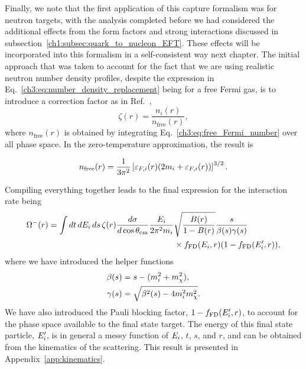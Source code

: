 Finally, we note that the first application of this capture formalism was for neutron targets, with the analysis completed before we had considered the additional effects from the form factors and strong interactions discussed in subsection~\ref{ch1:subsec:quark_to_nucleon_EFT}. These effects will be incorporated into this formalism in a self-consistent way next chapter. The initial approach that was taken to account for the fact that we are using realistic neutron number density profiles, despite the expression in Eq.~\ref{ch3:eq:number_density_replacement} being for a free Fermi gas, is to introduce a correction factor as in Ref.~\cite{Garani:2018kkd_may_NewAnalysisNeutron},
\begin{equation}
    \zeta(r) = \frac{n_i(r)}{n_\mathrm{free}(r)},
\end{equation}
where $n_\mathrm{free}(r)$ is obtained by integrating Eq.~\ref{ch3:eq:free_Fermi_number} over all phase space. In the zero-temperature approximation, the result is

\begin{equation}
    n_\mathrm{free}(r) = \frac{1}{3\pi^2}\left[ \varepsilon_{F,i}(r)(2m_i + \varepsilon_{F,i}(r))\right]^{3/2}.
\end{equation}

Compiling everything together leads to the final expression for the interaction rate being
\begin{equation}
    \begin{split}
        \Omega^-(r) = \int dt\,dE_i\,ds\,\zeta(r) \frac{d\sigma}{d\cos\theta_\mathrm{cm}}\frac{E_i}{2\pi^2 m_i}&\sqrt{\frac{B(r)}{1 - B(r)}} \frac{s}{\beta(s)\gamma(s)}\\
        &\times f_{\rm FD}(E_i, r)(1 - f_{\rm FD}(E_i', r)),
    \end{split}
    \label{ch3:eq:int_rate_capture_full}
\end{equation}
where we have introduced the helper functions
\begin{align}
    \beta(s) & = s - (m_i^2 + m_\chi^2),\\
    \gamma(s) & = \sqrt{\beta^2(s) - 4 m_i^2 m_\chi^2}.
\end{align}
We have also introduced the Pauli blocking factor, $1 - f_{\rm FD}(E_i', r)$, to account for the phase space available to the final state target. The energy of this final state particle, $E_i'$, is in general a messy function of $E_i$, $t$, $s$, and $r$, and can be obtained from the kinematics of the scattering. This result is presented in Appendix~\ref{app:kinematics}.

